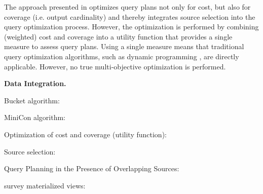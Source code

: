 The approach presented in \cite{nie_joint_2001} optimizes query plans
not only for cost, but also for coverage (i.e. output cardinality) and
thereby integrates source selection into the query optimization
process. However, the optimization is performed by combining
(weighted) cost and coverage into a utility function that provides a
single measure to assess query plans. Using a single measure means
that traditional query optimization algorithms, such as dynamic
programming \cite{selinger_access_1979}, are directly
applicable. However, no true multi-objective optimization is
performed.


\textbf{Data Integration.}

Bucket algorithm: \cite{levy_querying_1996}

MiniCon algorithm: \cite{pottinger_minicon:_2001}

Optimization of cost and coverage (utility function):
\cite{nie_joint_2001}

Source selection: \cite{pomares_source_2010}

Query Planning in the Presence of Overlapping Sources:
\cite{bleiholder_query_2006}

survey materialized views: \cite{halevy_answering_2001}



